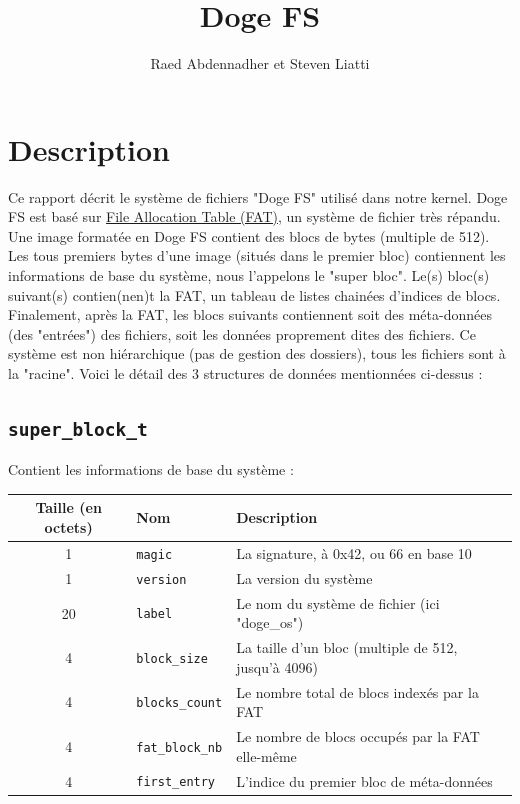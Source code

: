 \documentclass[a4paper, 12pt]{article}
\begin{document}
\title{Doge FS}
\author{Raed Abdennadher et Steven Liatti}
\maketitle


\section{Description}
Ce rapport décrit le système de fichiers "Doge FS" utilisé dans notre kernel. Doge FS est basé sur
\href{https://en.wikipedia.org/wiki/File_Allocation_Table}{File Allocation Table (FAT)}, un système
de fichier très répandu. Une image formatée en Doge FS contient des blocs de bytes (multiple de 512).
Les tous premiers bytes d'une image (situés dans le premier bloc) contiennent les informations de base
du système, nous l'appelons le "super bloc". Le(s) bloc(s) suivant(s) contien(nen)t la FAT, un tableau de
listes chainées d'indices de blocs. Finalement, après la FAT, les blocs suivants contiennent soit des
méta-données (des "entrées") des fichiers, soit les données proprement dites des fichiers. Ce système
est non hiérarchique (pas de gestion des dossiers), tous les fichiers sont à la "racine".
Voici le détail des 3 structures de données mentionnées ci-dessus :

\subsection{\texttt{super_block_t}} Contient les informations de base du système :

\begin{tabular}{|c|l|p{.5\linewidth}|}	\hline
	\textbf{Taille (en octets)}	& \textbf{Nom} & \textbf{Description} \\ \hline
	1	& \texttt{magic}			& La signature, à 0x42, ou 66 en base 10 				\\ \hline
	1	& \texttt{version}		& La version du système 								\\ \hline
	20	& \texttt{label}			& Le nom du système de fichier (ici "doge\_os")			\\ \hline
	4	& \texttt{block_size}	& La taille d'un bloc (multiple de 512, jusqu'à 4096) 	\\ \hline
	4	& \texttt{blocks_count}		& Le nombre total de blocs indexés par la FAT 			\\ \hline
	4	& \texttt{fat_block_nb}	& Le nombre de blocs occupés par la FAT elle-même 		\\ \hline
	4	& \texttt{first_entry}	& L'indice du premier bloc de méta-données				\\ \hline
\end{tabular}
\end{document}
